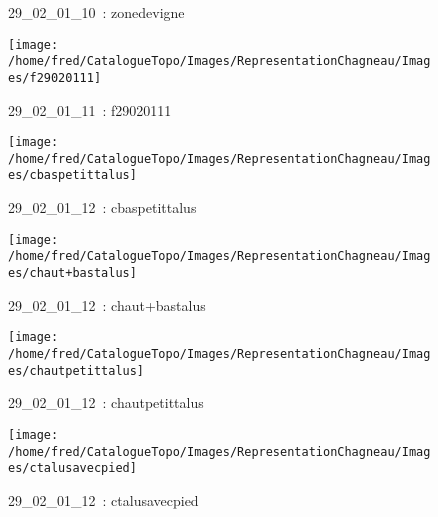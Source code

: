\documentclass[12pt,titlepage]{book}
\begin{document}
\begin{figure}[h!]
\begin{minipage}[t]{3cm}
\begin{center}
      \caption[~29\_02\_01\_10]{\small{29\_02\_01\_10~:} \tiny{zonedevigne}}\label{zonedevigne}
    \end{center}
  \end{minipage}
  \begin{minipage}[t]{3cm}
    \begin{center}
      \texttt{[image: /home/fred/CatalogueTopo/Images/RepresentationChagneau/Images/f29020111]}
      \caption[~29\_02\_01\_11]{\small{29\_02\_01\_11~:} \tiny{f29020111}}\label{f29020111}
    \end{center}
  \end{minipage}
  \begin{minipage}[t]{3cm}
    \begin{center}
      \texttt{[image: /home/fred/CatalogueTopo/Images/RepresentationChagneau/Images/cbaspetittalus]}
      \caption[~29\_02\_01\_12]{\small{29\_02\_01\_12~:} \tiny{cbaspetittalus}}\label{cbaspetittalus}
    \end{center}
  \end{minipage}
  \begin{minipage}[t]{3cm}
    \begin{center}
      \texttt{[image: /home/fred/CatalogueTopo/Images/RepresentationChagneau/Images/chaut+bastalus]}
      \caption[~29\_02\_01\_12]{\small{29\_02\_01\_12~:} \tiny{chaut+bastalus}}\label{chaut+bastalus}
    \end{center}
  \end{minipage}
  \begin{minipage}[t]{3cm}
    \begin{center}
      \texttt{[image: /home/fred/CatalogueTopo/Images/RepresentationChagneau/Images/chautpetittalus]}
      \caption[~29\_02\_01\_12]{\small{29\_02\_01\_12~:} \tiny{chautpetittalus}}\label{chautpetittalus}
    \end{center}
  \end{minipage}
  \begin{minipage}[t]{3cm}
    \begin{center}
      \texttt{[image: /home/fred/CatalogueTopo/Images/RepresentationChagneau/Images/ctalusavecpied]}
      \caption[~29\_02\_01\_12]{\small{29\_02\_01\_12~:} \tiny{ctalusavecpied}}\label{ctalusavecpied}
    \end{center}

\end{minipage}
\end{figure}
\end{document}
